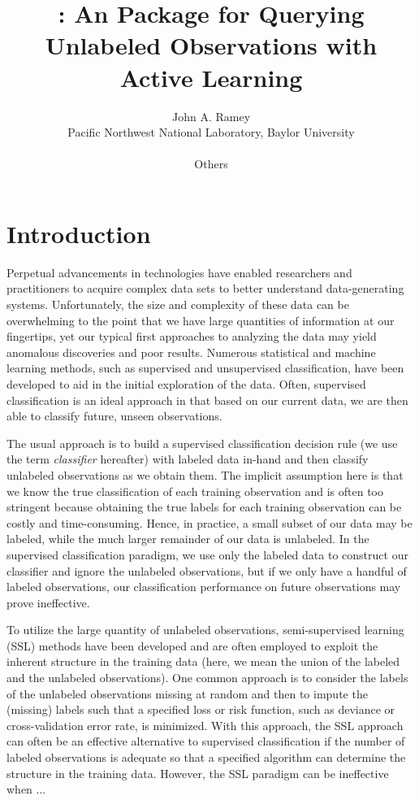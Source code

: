\documentclass[article]{jss}
\author{John A. Ramey\\Pacific Northwest National Laboratory, Baylor University\\\\Others}
\title{\pkg{activelearning}: An \proglang{R} Package for Querying Unlabeled Observations with Active Learning}
\begin{document}

\maketitle


\section{Introduction}

Perpetual advancements in technologies have enabled researchers and practitioners to acquire complex data sets to better understand data-generating systems. Unfortunately, the size and complexity of these data can be overwhelming to the point that we have large quantities of information at our fingertips, yet our typical first approaches to analyzing the data may yield anomalous discoveries and poor results. Numerous statistical and machine learning methods, such as supervised and unsupervised classification, have been developed to aid in the initial exploration of the data. Often, supervised classification is an ideal approach in that based on our current data, we are then able to classify future, unseen observations.

The usual approach is to build a supervised classification decision rule (we use the term \emph{classifier} hereafter) with labeled data in-hand and then classify unlabeled observations as we obtain them. The implicit assumption here is that we know the true classification of each training observation and is often too stringent because obtaining the true labels for each training observation can be costly and time-consuming. Hence, in practice, a small subset of our data may be labeled, while the much larger remainder of our data is unlabeled. In the supervised classification paradigm, we use only the labeled data to construct our classifier and ignore the unlabeled observations, but if we only have a handful of labeled observations, our classification performance on future observations may prove ineffective.


To utilize the large quantity of unlabeled observations, semi-supervised learning (SSL) methods have been developed and are often employed to exploit the  inherent structure in the training data (here, we mean the union of the labeled and the unlabeled observations). One common approach is to consider the labels of the unlabeled observations missing at random and then to impute the (missing) labels such that a specified loss or risk function, such as deviance or cross-validation error rate, is minimized. With this approach, the SSL approach can often be an effective alternative to supervised classification if the number of labeled observations is adequate so that a specified algorithm can determine the structure in the training data. However, the SSL paradigm can be ineffective when ... %
\end{document}
